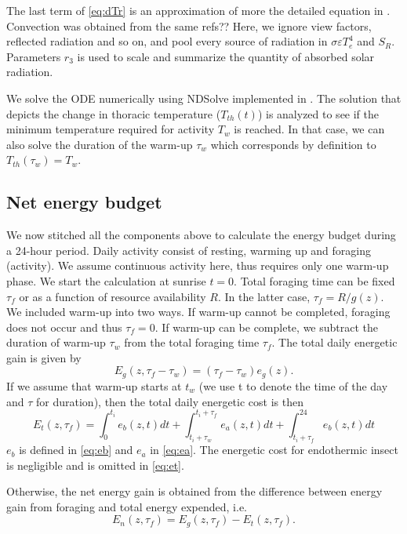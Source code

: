 The last term of \cref{eq:dTr}  is an approximation of more the detailed equation in \citet{Campbell2012}.
Convection was obtained from the same refs??
Here, we ignore view factors, reflected radiation and so on, and pool every source of radiation in $ \sigma \varepsilon T_e^4$ and $S_R$. 
Parameters $r_3$ is used to scale and summarize the quantity of absorbed solar radiation.

We  solve the ODE numerically using NDSolve implemented in \citet{Mathematica10}.
The solution that depicts the change in thoracic temperature  ($T_{th}(t)$) is analyzed to see if the minimum temperature  required for activity $T_w$ is reached.
In that case, we can also solve the duration of the warm-up $\tau_w$ which corresponds by definition to $T_{th}(\tau_w) = T_w$. 

 
\subsection*{Net energy budget}
We now stitched all the components above to calculate  the energy budget during a 24-hour period.
Daily activity consist of resting, warming up and foraging (activity).
We assume continuous activity here, thus requires only one warm-up phase.
We start the calculation at sunrise $t = 0$.
Total foraging time can be fixed $\tau_f$ or as a function of resource availability $R$. 
In the latter case, $\tau_f = R/g(z)$.
We included warm-up into two ways.
If warm-up cannot be completed, foraging does not occur and thus $\tau_f = 0$.
If warm-up can be complete, we subtract the duration of warm-up $\tau_w$ from the total foraging time $\tau_f$. 
The total daily energetic gain is given by
\[
	E_g(z,\tau_f - \tau_w) = (\tau_f - \tau_w) e_g(z).
\]
%
If we assume that warm-up starts at $t_w$ (we use t to denote the time of the day and $\tau$ for duration), then the total daily  energetic cost is then
\begin{equation} \label{eq:et}
	E_t(z, \tau_f) = \int_0^{t_i} e_b(z, t) dt + \int_{t_i + \tau_w}^{t_i + \tau_f } e_a(z,t) dt + \int_{t_i+\tau_f}^{24} e_b(z, t) dt 
\end{equation}
$e_b$ is defined in \cref{eq:eb}  and $e_a$ in \cref{eq:ea}.
The energetic cost for endothermic insect is negligible \citep{Heinrich1975} and is omitted in \cref{eq:et}.


Otherwise, the net energy gain is obtained from the  difference between energy gain from foraging and total energy expended, i.e.
\[ 
	E_n(z, \tau_f) = E_g(z,\tau_f) - E_t(z, \tau_f).
\]

